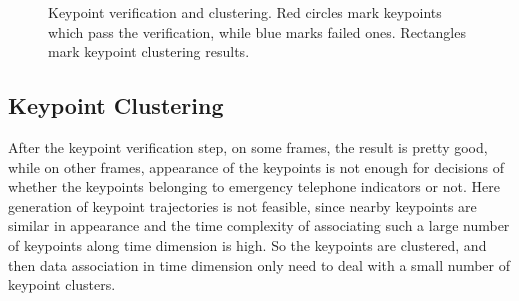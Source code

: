 \begin{figure}
\centering
{}
\caption{Keypoint verification and clustering. Red circles mark keypoints which pass the verification, while blue marks failed ones. Rectangles mark keypoint clustering results. }
\label{fig:thir}
\end{figure}
\subsection{Keypoint Clustering}
After the keypoint verification step, on some frames, the result is pretty good, while on other frames, appearance of the keypoints is not enough for decisions of whether the keypoints belonging to emergency telephone indicators or not. Here generation of keypoint trajectories is not feasible, since nearby keypoints are similar in appearance and  the time complexity of associating such a large number of keypoints along time dimension is high. So the keypoints are clustered, and then data association in time dimension only need to deal with a small number of keypoint clusters.

